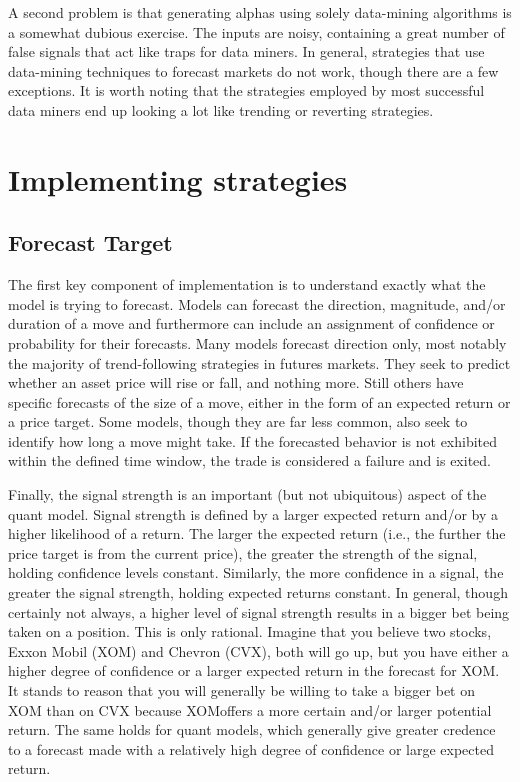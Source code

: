 \documentclass[11pt]{report}
\begin{document}
			A second problem is that generating alphas using solely data-mining algorithms is a somewhat dubious exercise. The inputs are noisy, containing a great number of false signals that act like traps for data miners. In general, strategies that use data-mining techniques to forecast markets do not work, though there are a few exceptions. It is worth noting that the strategies employed by most successful data miners end up looking a lot like trending or reverting strategies.

		\section{Implementing strategies}

			\subsection{Forecast Target}

				The first key component of implementation is to understand exactly what the model is trying to forecast. Models can forecast the direction, magnitude, and/or duration of a move and furthermore can include an assignment of confidence or probability for their forecasts. Many models forecast direction only, most notably the majority of trend-following strategies in futures markets. They seek to predict whether an asset price will rise or fall, and nothing more. Still others have specific forecasts of the size of a move, either in the form of an expected return or a price target. Some models, though they are far less common, also seek to identify how long a move might take. If the forecasted behavior is not exhibited within the defined time window, the trade is considered a failure and is exited.

				Finally, the signal strength is an important (but not ubiquitous) aspect of the quant model. Signal strength is defined by a larger expected return and/or by a higher likelihood of a return. The larger the expected return (i.e., the further the price target is from the current price), the greater the strength of the signal, holding confidence levels constant. Similarly, the more confidence in a signal, the greater the signal strength, holding expected returns constant. In general, though certainly not always, a higher level of signal strength results in a bigger bet being taken on a position. This is only rational. Imagine that you believe two stocks, Exxon Mobil (XOM) and Chevron (CVX), both will go up, but you have either a higher degree of confidence or a larger expected return in the forecast for XOM. It stands to reason that you will generally be willing to take a bigger bet on XOM than on CVX because XOMoffers a more certain and/or larger potential return. The same holds for quant models, which generally give greater credence to a forecast made with a relatively high degree of confidence or large expected return.
\end{document}
